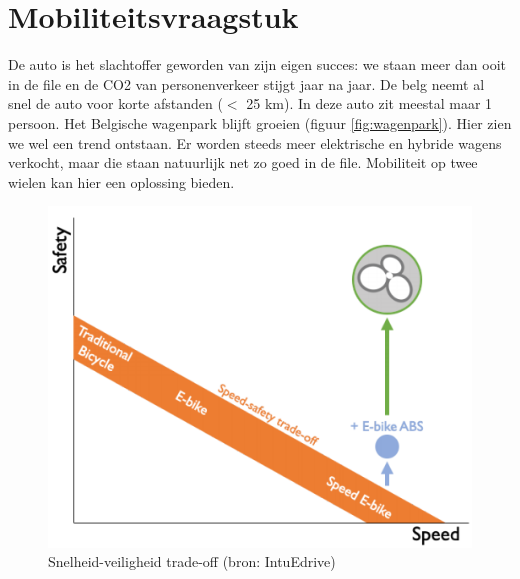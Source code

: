 \section{Mobiliteitsvraagstuk}
De auto is het slachtoffer geworden van zijn eigen succes: we staan meer dan ooit in de file en de CO2 van personenverkeer stijgt jaar na jaar. De belg neemt al snel de auto voor korte afstanden ($<$ 25 km). In deze auto zit meestal maar 1 persoon. Het Belgische wagenpark blijft groeien (figuur \ref{fig:wagenpark}). Hier zien we wel een trend ontstaan. Er worden steeds meer elektrische en hybride wagens verkocht, maar die staan natuurlijk net zo goed in de file. Mobiliteit op twee wielen kan hier een oplossing bieden.
\\

\begin{figure}
  \centering
  \includegraphics[width=1.1\linewidth]{images/snelheid-veiligheid-tradeoff.png}
  \caption{Snelheid-veiligheid trade-off (bron: IntuEdrive)}
  \label{fig:snelheid-veiligheid trade-off (bron: IntuEdrive)}
\end{figure}

